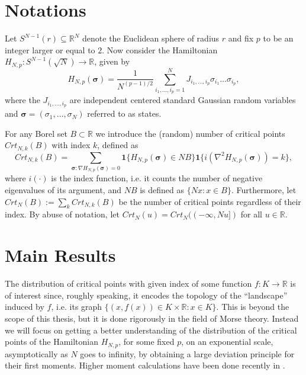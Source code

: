\section{Notations}
Let $S^{N-1}(r)\subseteq\mathbb R^N$ denote the Euclidean sphere of radius $r$ and fix $p$ to be an integer larger or equal to $2$. Now consider the Hamiltonian $H_{N,p}: S^{N-1}(\sqrt N)\rightarrow\mathbb R$, given by
$$H_{N,p}(\bm\sigma)=\frac{1}{N^{(p-1)/2}}\sum_{i_1,\dots,i_p=1}^N J_{i_1,\dots,i_p}\sigma_{i_1}\dots\sigma_{i_p},$$
where the $J_{i_1,\dots,i_p}$ are independent centered standard Gaussian random variables and $\bm\sigma=(\sigma_1,\dots,\sigma_N)$ referred to as states.

For any Borel set $B\subset\mathbb R$ we introduce the (random) number of critical points $Crt_{N,k}(B)$ with index $k$, defined as
$$Crt_{N,k}(B) = \sum_{\bm\sigma : \nabla H_{N,p}(\bm\sigma)=0}\bm 1\{H_{N,p}(\bm\sigma)\in NB\}\bm 1\{i(\nabla^2 H_{N,p}(\bm\sigma))=k\},$$
where $i(\cdot)$ is the index function, i.e. it counts the number of negative eigenvalues of its argument, and $NB$ is defined as $\{Nx : x\in B\}$. Furthermore, let $Crt_N(B):=\sum_k Crt_{N,k}(B)$ be the number of critical points regardless of their index.
By abuse of notation, let $Crt_N(u) = Crt_N((-\infty,Nu])$ for all $u\in\mathbb R$.



\section{Main Results}
The distribution of critical points with given index of some function $f:K\rightarrow\mathbb R$ is of interest since, roughly speaking, it encodes the topology of the ``landscape'' induced by $f$, i.e. its graph $\{(x,f(x))\in K\times\mathbb R : x\in K \}$. This is beyond the scope of this thesis, but it is done rigorously in the field of Morse theory. Instead we will focus on getting a better understanding of the distribution of the critical points of the Hamiltonian $H_{N,p}$, for some fixed $p$, on an exponential scale, asymptotically as $N$ goes to infinity, by obtaining a large deviation principle for their first moments. Higher moment calculations have been done recently in \cite{subag2015extremal}.

